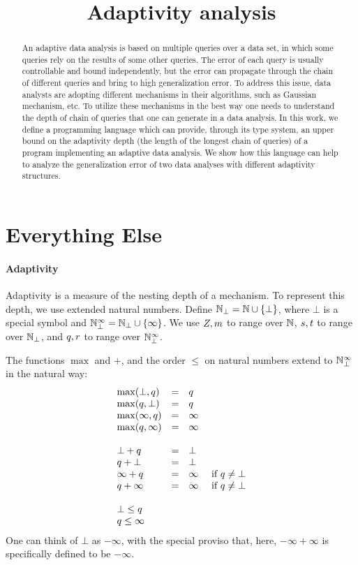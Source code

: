 \documentclass[a4paper,11pt]{article}
\title{Adaptivity analysis}
\author{}
\date{}
\theoremstyle{definition}
\begin{document}
\maketitle

\begin{abstract}
An adaptive data analysis is based on multiple queries over a data set, in which some queries rely on the results of some other queries. The error of each query is usually controllable and bound independently, but the error can propagate through the chain of different queries and bring to high generalization error. To address this issue, data analysts are adopting different mechanisms in their algorithms, such as Gaussian mechanism, etc. To utilize these mechanisms in the best way one needs to understand the depth of chain of queries that one can generate in a data analysis. In this work, we define a programming language which can provide, through its type system, an upper bound on the adaptivity  depth (the length of the longest chain of queries) of a program implementing an adaptive data analysis. We show how this language can help to analyze the generalization error of two data analyses with different adaptivity structures.
\end{abstract}


\section{Everything Else}

\paragraph{Adaptivity}
Adaptivity is a measure of the nesting depth of a mechanism. To
represent this depth, we use extended natural numbers. Define $\mathbb{N}_{\bot} =
\mathbb{N} \cup \{\bot\}$, where $\bot$ is a special symbol and $\mathbb{N}_{\bot}^\infty =
\mathbb{N}_{\bot} \cup \{\infty\}$. We use $Z, m$ to range over $\mathbb{N}$,
$s, t$ to range over $\mathbb{N}_{\bot}$, and $q, r$ to
range over $\mathbb{N}_{\bot}^\infty$.

The functions $\max$ and $+$, and the order $\leq$ on natural numbers
extend to $\mathbb{N}_{\bot}^\infty$ in the natural way:
\[\begin{array}{lcl}
\max(\bot, \nnatbiA) & = & \nnatbiA \\
\max(\nnatbiA, \bot) & = & \nnatbiA \\
\max(\infty, \nnatbiA) & = & \infty \\
\max(\nnatbiA, \infty) & = & \infty \\
\\
%
\bot + \nnatbiA & = & \bot \\
\nnatbiA + \bot & = & \bot \\
\infty + \nnatbiA & = & \infty ~~~~ \mbox{if } \nnatbiA \neq \bot \\
\nnatbiA + \infty & = & \infty ~~~~ \mbox{if } \nnatbiA \neq \bot \\
\\
%
\bot \leq \nnatbiA \\
\nnatbiA \leq \infty
\end{array}
\]
One can think of $\bot$ as $-\infty$, with the special proviso that,
here, $-\infty + \infty$ is specifically defined to be $-\infty$.
\end{document}
